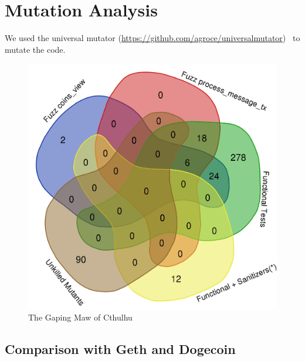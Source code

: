 \section{Mutation Analysis}

We used the universal mutator (\url{https://github.com/agroce/universalmutator})~\cite{regexpMut} to mutate the code.

\begin{figure}
\vspace{2mm}
\includegraphics[width=1.9\columnwidth]{kill_pre_valgrind.png}
\caption{The Gaping Maw of Cthulhu}
\end{figure}

\subsection{Comparison with Geth and Dogecoin}
